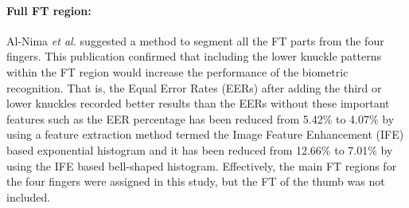 \documentclass[review]{elsarticle}
\begin{document}
	\paragraph{\textbf{Full FT region:}} Al-Nima \textit{et al.} \cite{Al-Nima2015Human} suggested a method to segment all the FT parts from the four fingers. This publication confirmed that including the lower knuckle patterns within the FT region would increase the performance of the biometric recognition. That is, the Equal Error Rates (EERs) after adding the third or lower knuckles recorded better results than the EERs without these important features such as the EER percentage has been reduced from 5.42\% to 4.07\% by using a feature extraction method termed the Image Feature Enhancement (IFE) based exponential histogram and it has been reduced from 12.66\% to 7.01\% by using the IFE based bell-shaped histogram. Effectively, the main FT regions for the four fingers were assigned in this study, but the FT of the thumb was not included.
\end{document}
